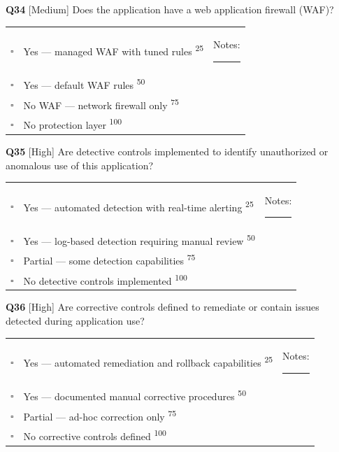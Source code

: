 \documentclass[11pt,landscape]{article}
\begin{document}
\vspace{0.3cm}

\noindent\colorbox{medbg}{\textbf{Q34} [Medium]} Does the application have a web application firewall (WAF)?

\begin{tabularx}{\textwidth}{cXX}
$\square$ & Yes --- managed WAF with tuned rules \textsuperscript{\scriptsize\textcolor{stridegray}{25}} & Notes: \rule{4cm}{0.4pt} \\
$\square$ & Yes --- default WAF rules \textsuperscript{\scriptsize\textcolor{stridegray}{50}} &  \\
$\square$ & No WAF --- network firewall only \textsuperscript{\scriptsize\textcolor{stridegray}{75}} &  \\
$\square$ & No protection layer \textsuperscript{\scriptsize\textcolor{stridegray}{100}} &  \\
\end{tabularx}

\vspace{0.3cm}

\noindent\colorbox{highbg}{\textbf{Q35} [High]} Are detective controls implemented to identify unauthorized or anomalous use of this application?

\begin{tabularx}{\textwidth}{cXX}
$\square$ & Yes --- automated detection with real-time alerting \textsuperscript{\scriptsize\textcolor{stridegray}{25}} & Notes: \rule{4cm}{0.4pt} \\
$\square$ & Yes --- log-based detection requiring manual review \textsuperscript{\scriptsize\textcolor{stridegray}{50}} &  \\
$\square$ & Partial --- some detection capabilities \textsuperscript{\scriptsize\textcolor{stridegray}{75}} &  \\
$\square$ & No detective controls implemented \textsuperscript{\scriptsize\textcolor{stridegray}{100}} &  \\
\end{tabularx}

\vspace{0.3cm}

\noindent\colorbox{highbg}{\textbf{Q36} [High]} Are corrective controls defined to remediate or contain issues detected during application use?

\begin{tabularx}{\textwidth}{cXX}
$\square$ & Yes --- automated remediation and rollback capabilities \textsuperscript{\scriptsize\textcolor{stridegray}{25}} & Notes: \rule{4cm}{0.4pt} \\
$\square$ & Yes --- documented manual corrective procedures \textsuperscript{\scriptsize\textcolor{stridegray}{50}} &  \\
$\square$ & Partial --- ad-hoc correction only \textsuperscript{\scriptsize\textcolor{stridegray}{75}} &  \\
$\square$ & No corrective controls defined \textsuperscript{\scriptsize\textcolor{stridegray}{100}} &  \\
\end{tabularx}
\end{document}
